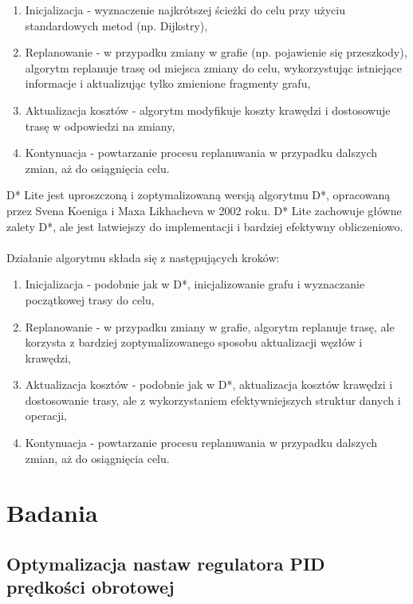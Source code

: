 \documentclass[12pt,twoside]{article}
\begin{document}
\begin{enumerate}[label=\alph*), leftmargin=1.25cm]
	\item Inicjalizacja - wyznaczenie najkrótszej ścieżki do celu przy użyciu standardowych metod (np. Dijkstry),
	\item Replanowanie - w przypadku zmiany w grafie (np. pojawienie się przeszkody), algorytm replanuje trasę od miejsca zmiany do celu, wykorzystując istniejące informacje i aktualizując tylko zmienione fragmenty grafu,
	\item Aktualizacja kosztów - algorytm modyfikuje koszty krawędzi i dostosowuje trasę w odpowiedzi na zmiany,
	\item Kontynuacja - powtarzanie procesu replanuwania w przypadku dalszych zmian, aż do osiągnięcia celu.
	
\end{enumerate}

D* Lite \cite{DSTARLITE} jest uproszczoną i zoptymalizowaną wersją algorytmu D*, opracowaną przez Svena Koeniga i Maxa Likhacheva w 2002 roku. D* Lite zachowuje główne zalety D*, ale jest łatwiejszy do implementacji i bardziej efektywny obliczeniowo.
\\ \\
Działanie algorytmu składa się z następujących kroków:

\begin{enumerate}[label=\alph*), leftmargin=1.25cm]
	\item Inicjalizacja - podobnie jak w D*, inicjalizowanie grafu i wyznaczanie początkowej trasy do celu,
	\item Replanowanie - w przypadku zmiany w grafie, algorytm replanuje trasę, ale korzysta z bardziej zoptymalizowanego sposobu aktualizacji węzłów i krawędzi,
	\item Aktualizacja kosztów - podobnie jak w D*, aktualizacja kosztów krawędzi i dostosowanie trasy, ale z wykorzystaniem efektywniejszych struktur danych i operacji,
	\item Kontynuacja - powtarzanie procesu replanuwania w przypadku dalszych zmian, aż do osiągnięcia celu.
	
\end{enumerate}

\section{Badania}
\subsection{Optymalizacja nastaw regulatora PID prędkości obrotowej}
\end{document}
